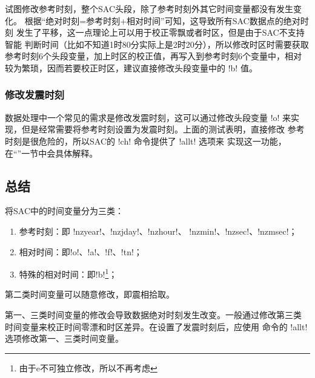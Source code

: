 试图修改参考时刻，整个SAC头段，除了参考时刻外其它时间变量都没有发生变化。
根据``绝对时刻=参考时刻+相对时间''可知，这导致所有SAC数据点的绝对时刻
发生了平移，这一点理论上可以用于校正零飘或者时区，但是由于SAC不支持智能
判断时间（比如不知道1时80分实际上是2时20分），所以修改时区时需要获取
参考时刻6个头段变量，加上时区的校正值，再写入到参考时刻6个变量中，相对
较为繁琐，因而若要校正时区，建议直接修改头段变量中的 !b! 值。

\subsubsection{修改发震时刻}
数据处理中一个常见的需求是修改发震时刻，这可以通过修改头段变量 !o!
来实现，但是经常需要将参考时刻设置为发震时刻。上面的测试表明，直接修改
参考时刻是很危险的，所以SAC的 !ch! 命令提供了 !allt! 选项来
实现这一功能，在``''一节中会具体解释。

\subsection{总结}
将SAC中的时间变量分为三类：
\begin{enumerate}
\item 参考时刻：即 !nzyear!、!nzjday!、!nzhour!、
    !nzmin!、!nzsec!、!nzmsec!；
\item 相对时间：即!o!、!a!、!f!、!tn!；
\item 特殊的相对时间：即!b!\footnote{由于e不可独立修改，所以不再考虑}；
\end{enumerate}

第二类时间变量可以随意修改，即震相拾取。

第一、三类时间变量的修改会导致数据绝对时刻发生改变。一般通过修改第三类
时间变量来校正时间零漂和时区差异。在设置了发震时刻后，应使用
 命令的 !allt! 选项修改第一、三类时间变量。
